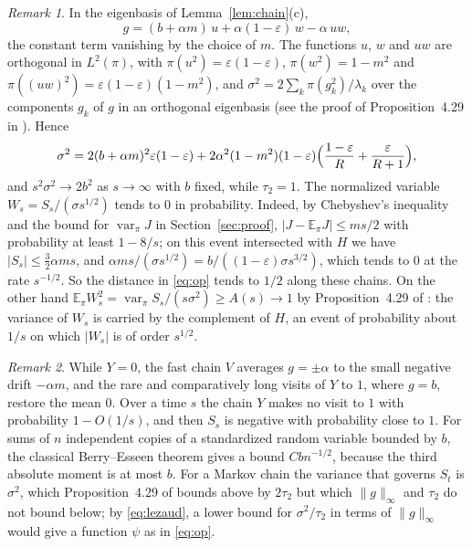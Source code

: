 \documentclass[11pt]{amsart}
\theoremstyle{remark}
\newtheorem{remark}{Remark}
\numberwithin{equation}{section}
\newcommand{\E}{\mathbb E}
\DeclareMathOperator{\var}{var}
\begin{document}
\begin{remark}\label{rem:sigma}
In the eigenbasis of Lemma~\ref{lem:chain}(c),
\[
g=(b+\alpha m)\,u+\alpha(1-\varepsilon)\,w-\alpha\,uw ,
\]
the constant term vanishing by the choice of $m$. The functions $u$, $w$ and $uw$ are orthogonal in $L^2(\pi)$, with $\pi(u^2)=\varepsilon(1-\varepsilon)$, $\pi(w^2)=1-m^2$ and $\pi((uw)^2)=\varepsilon(1-\varepsilon)(1-m^2)$, and $\sigma^2=2\sum_k\pi(g_k^2)/\lambda_k$ over the components $g_k$ of $g$ in an orthogonal eigenbasis (see the proof of Proposition~4.29 in \cite{AF}). Hence
\[
\sigma^2=2(b+\alpha m)^2\varepsilon(1-\varepsilon)+2\alpha^2(1-m^2)(1-\varepsilon)\Bigl(\frac{1-\varepsilon}R+\frac{\varepsilon}{R+1}\Bigr),
\]
and $s^2\sigma^2\to2b^2$ as $s\to\infty$ with $b$ fixed, while $\tau_2=1$. The normalized variable $W_s=S_s/(\sigma s^{1/2})$ tends to $0$ in probability. Indeed, by Chebyshev's inequality and the bound for $\var_\pi J$ in Section~\ref{sec:proof}, $|J-\E_\pi J|\le ms/2$ with probability at least $1-8/s$; on this event intersected with $H$ we have $|S_s|\le\frac32\alpha ms$, and $\alpha ms/(\sigma s^{1/2})=b/((1-\varepsilon)\sigma s^{3/2})$, which tends to $0$ at the rate $s^{-1/2}$. So the distance in \eqref{eq:op} tends to $1/2$ along these chains. On the other hand $\E_\pi W_s^2=\var_\pi S_s/(s\sigma^2)\ge A(s)\to1$ by Proposition~4.29 of \cite{AF}: the variance of $W_s$ is carried by the complement of $H$, an event of probability about $1/s$ on which $|W_s|$ is of order $s^{1/2}$.
\end{remark}

\begin{remark}
While $Y=0$, the fast chain $V$ averages $g=\pm\alpha$ to the small negative drift $-\alpha m$, and the rare and comparatively long visits of $Y$ to $1$, where $g=b$, restore the mean $0$. Over a time $s$ the chain $Y$ makes no visit to $1$ with probability $1-O(1/s)$, and then $S_s$ is negative with probability close to $1$. For sums of $n$ independent copies of a standardized random variable bounded by $b$, the classical Berry--Esseen theorem gives a bound $Cbn^{-1/2}$, because the third absolute moment is at most $b$. For a Markov chain the variance that governs $S_t$ is $\sigma^2$, which Proposition~4.29 of \cite{AF} bounds above by $2\tau_2$ but which $\|g\|_\infty$ and $\tau_2$ do not bound below; by \eqref{eq:lezaud}, a lower bound for $\sigma^2/\tau_2$ in terms of $\|g\|_\infty$ would give a function $\psi$ as in \eqref{eq:op}.
\end{remark}
\end{document}
